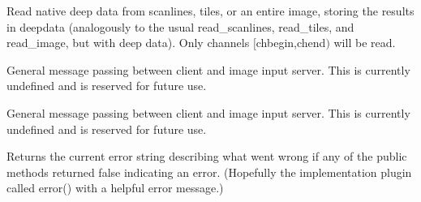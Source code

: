 Read native deep data from scanlines, tiles, or an entire image, 
storing the results in {\cf deepdata} (analogously to the usual
{\cf read_scanlines}, {\cf read_tiles},
and {\cf read_image}, but with deep data).
Only channels $[${\cf chbegin},{\cf chend}$)$
will be read.
\apiend

General message passing between client and image input server.
This is currently undefined and is reserved for future use.
\apiend

General message passing between client and image input server.
This is currently undefined and is reserved for future use.
\apiend

Returns the current error string describing what went wrong if
any of the public methods returned {\kw false} indicating an error.
(Hopefully the implementation plugin called {\kw error()} with a
helpful error message.)
\apiend




\chapwidthend
